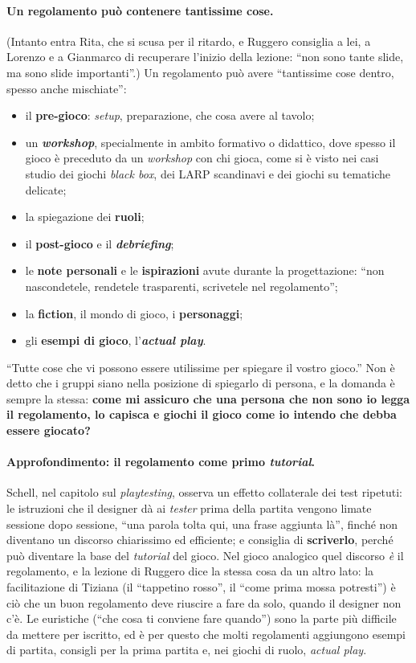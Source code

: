 \paragraph{Un regolamento può contenere tantissime cose.} (Intanto entra Rita, che si
scusa per il ritardo, e Ruggero consiglia a lei, a Lorenzo e a Gianmarco di recuperare
l'inizio della lezione: ``non sono tante slide, ma sono slide importanti''.) Un
regolamento può avere ``tantissime cose dentro, spesso anche mischiate'':
\begin{itemize}
  \item il \textbf{pre-gioco}: \emph{setup}, preparazione, che cosa avere al tavolo;
  \item un \textbf{\emph{workshop}}, specialmente in ambito formativo o didattico, dove
        spesso il gioco è preceduto da un \emph{workshop} con chi gioca, come si è visto
        nei casi studio dei giochi \emph{black box}, dei LARP scandinavi e dei giochi su
        tematiche delicate;
  \item la spiegazione dei \textbf{ruoli};
  \item il \textbf{post-gioco} e il \textbf{\emph{debriefing}};
  \item le \textbf{note personali} e le \textbf{ispirazioni} avute durante la
        progettazione: ``non nascondetele, rendetele trasparenti, scrivetele nel
        regolamento'';
  \item la \textbf{fiction}, il mondo di gioco, i \textbf{personaggi};
  \item gli \textbf{esempi di gioco}, l'\textbf{\emph{actual play}}.
\end{itemize}
``Tutte cose che vi possono essere utilissime per spiegare il vostro gioco.'' Non è detto
che i gruppi siano nella posizione di spiegarlo di persona, e la domanda è sempre la
stessa: \textbf{come mi assicuro che una persona che non sono io legga il regolamento, lo
capisca e giochi il gioco come io intendo che debba essere giocato?}

\paragraph{Approfondimento: il regolamento come primo \emph{tutorial}.} Schell, nel
capitolo sul \emph{playtesting}, osserva un effetto collaterale dei test ripetuti: le
istruzioni che il designer dà ai \emph{tester} prima della partita vengono limate
sessione dopo sessione, ``una parola tolta qui, una frase aggiunta là'', finché non
diventano un discorso chiarissimo ed efficiente; e consiglia di \textbf{scriverlo}, perché
può diventare la base del \emph{tutorial} del gioco. Nel gioco analogico quel discorso
\emph{è} il regolamento, e la lezione di Ruggero dice la stessa cosa da un altro lato:
la facilitazione di Tiziana (il ``tappetino rosso'', il ``come prima mossa potresti'') è
ciò che un buon regolamento deve riuscire a fare da solo, quando il designer non c'è.
Le euristiche (``che cosa ti conviene fare quando'') sono la parte più difficile da
mettere per iscritto, ed è per questo che molti regolamenti aggiungono esempi di partita,
consigli per la prima partita e, nei giochi di ruolo, \emph{actual play}.

